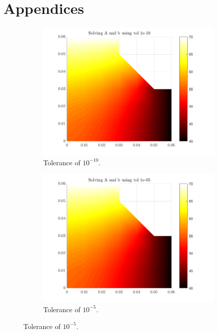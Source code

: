 \documentclass[12pt,a4paper]{article}
\begin{document}
\section{Appendices}

\begin{figure}
	\centering
	\begin{subfigure}[b]{0.4\textwidth}
		\centering
		\includegraphics[width=\textwidth]{images/Comparisontole-10.png}
		\caption{Tolerance of $10^{-10}$.}
		\label{fig:tole-10}
	\end{subfigure}
	\hfill
	\begin{subfigure}[b]{0.4\textwidth}
		\centering
		\includegraphics[width=\linewidth]{images/Comparisontole-05.png}
		\caption{Tolerance of $10^{-5}$.}

\end{subfigure}
\end{figure}
\end{document}
